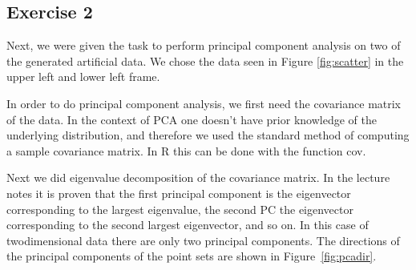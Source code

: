 \documentclass{article}
\begin{document}
\subsection{Exercise 2}

Next, we were given the task to perform principal component analysis
on two of the generated artificial data. We chose the data seen in
Figure \ref{fig:scatter} in the upper left and lower left frame.

In order to do principal component analysis, we first need the
covariance matrix of the data. In the context of PCA one doesn't have
prior knowledge of the underlying distribution, and therefore we used
the standard method of computing a sample covariance matrix. In R this
can be done with the function cov. 

Next we did eigenvalue decomposition of the covariance matrix. In the
lecture notes it is proven that the first principal component is the
eigenvector corresponding to the largest eigenvalue, the second PC the
eigenvector corresponding to the second largest eigenvector, and so
on. In this case of twodimensional data there are only two principal
components. The directions of the principal components of the point
sets are shown in Figure~\ref{fig:pcadir}. 
\end{document}
